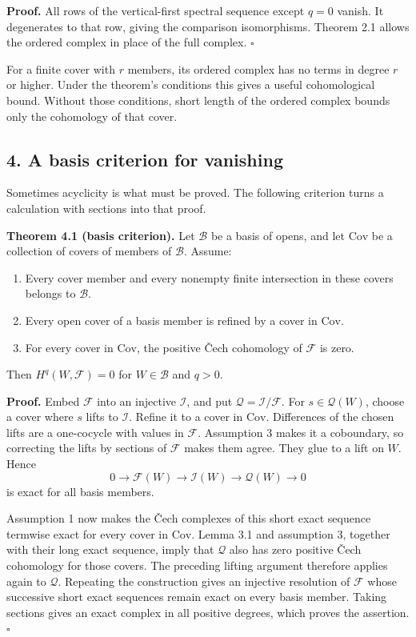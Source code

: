 \documentclass[11pt]{article}
\providecommand{\tightlist}{\setlength{\itemsep}{0pt}\setlength{\parskip}{0pt}}
\begin{document}
\textbf{Proof.} All rows of the vertical-first spectral sequence except
\(q=0\) vanish. It degenerates to that row, giving the comparison
isomorphisms. Theorem 2.1 allows the ordered complex in place of the
full complex. \(\square\)

For a finite cover with \(r\) members, its ordered complex has no terms
in degree \(r\) or higher. Under the theorem's conditions this gives a
useful cohomological bound. Without those conditions, short length of
the ordered complex bounds only the cohomology of that cover.

\subsection{4. A basis criterion for
vanishing}\label{a-basis-criterion-for-vanishing}

Sometimes acyclicity is what must be proved. The following criterion
turns a calculation with sections into that proof.

\textbf{Theorem 4.1 (basis criterion).} Let \(\mathcal B\) be a basis of
opens, and let \(\mathrm{Cov}\) be a collection of covers of members of
\(\mathcal B\). Assume:

\begin{enumerate}
\def\labelenumi{\arabic{enumi}.}
\tightlist
\item
  Every cover member and every nonempty finite intersection in these
  covers belongs to \(\mathcal B\).
\item
  Every open cover of a basis member is refined by a cover in
  \(\mathrm{Cov}\).
\item
  For every cover in \(\mathrm{Cov}\), the positive Čech cohomology of
  \(\mathcal F\) is zero.
\end{enumerate}

Then \(H^q(W,\mathcal F)=0\) for \(W\in\mathcal B\) and \(q>0\).

\textbf{Proof.} Embed \(\mathcal F\) into an injective \(\mathcal I\),
and put \(\mathcal Q=\mathcal I/\mathcal F\). For \(s\in\mathcal Q(W)\),
choose a cover where \(s\) lifts to \(\mathcal I\). Refine it to a cover
in \(\mathrm{Cov}\). Differences of the chosen lifts are a one-cocycle
with values in \(\mathcal F\). Assumption 3 makes it a coboundary, so
correcting the lifts by sections of \(\mathcal F\) makes them agree.
They glue to a lift on \(W\). Hence \[
0\to\mathcal F(W)\to\mathcal I(W)\to\mathcal Q(W)\to0
\] is exact for all basis members.

Assumption 1 now makes the Čech complexes of this short exact sequence
termwise exact for every cover in \(\mathrm{Cov}\). Lemma 3.1 and
assumption 3, together with their long exact sequence, imply that
\(\mathcal Q\) also has zero positive Čech cohomology for those covers.
The preceding lifting argument therefore applies again to
\(\mathcal Q\). Repeating the construction gives an injective resolution
of \(\mathcal F\) whose successive short exact sequences remain exact on
every basis member. Taking sections gives an exact complex in all
positive degrees, which proves the assertion. \(\square\)
\end{document}
